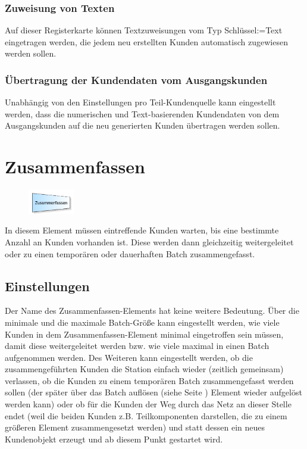 \subsubsection*{Zuweisung von Texten}

Auf dieser Registerkarte können Textzuweisungen vom Typ Schlüssel:=Text eingetragen werden,
die jedem neu erstellten Kunden automatisch zugewiesen werden sollen.

\subsubsection*{Übertragung der Kundendaten vom Ausgangskunden}

Unabhängig von den Einstellungen pro Teil-Kundenquelle kann eingestellt werden,
dass die numerischen und Text-basierenden Kundendaten von dem Ausgangskunden
auf die neu generierten Kunden übertragen werden sollen.


\section{Zusammenfassen}
\label{ref:ModelElementBatch}

\begin{figure}
\vspace{-22pt}
\includegraphics[width=2cm]{imageModelElementBatch.png}
\vspace{-22pt}
\end{figure}

In diesem Element müssen eintreffende Kunden warten, bis eine bestimmte Anzahl an Kunden vorhanden ist.
Diese werden dann gleichzeitig weitergeleitet oder zu einen temporären oder dauerhaften Batch zusammengefasst.

\subsection*{Einstellungen}

Der Name des Zusammenfassen-Elements hat keine weitere Bedeutung. Über die minimale und die maximale Batch-Größe kann
eingestellt werden, wie viele Kunden in dem Zusammenfassen-Element minimal eingetroffen sein müssen, damit diese 
weitergeleitet werden bzw. wie viele maximal in einen Batch aufgenommen werden. Des Weiteren kann eingestellt werden,
ob die zusammengeführten Kunden die Station einfach wieder (zeitlich gemeinsam) verlassen, ob die Kunden zu einem temporären
Batch zusammengefasst werden sollen (der später über das Batch auflösen (siehe Seite \pageref{ref:ModelElementSeparate}) Element
wieder aufgelöst werden kann) oder ob für die Kunden der Weg durch
das Netz an dieser Stelle endet (weil die beiden Kunden z.B. Teilkomponenten darstellen, die zu einem größeren Element
zusammengesetzt werden) und statt dessen ein neues Kundenobjekt erzeugt und ab diesem Punkt gestartet wird.


